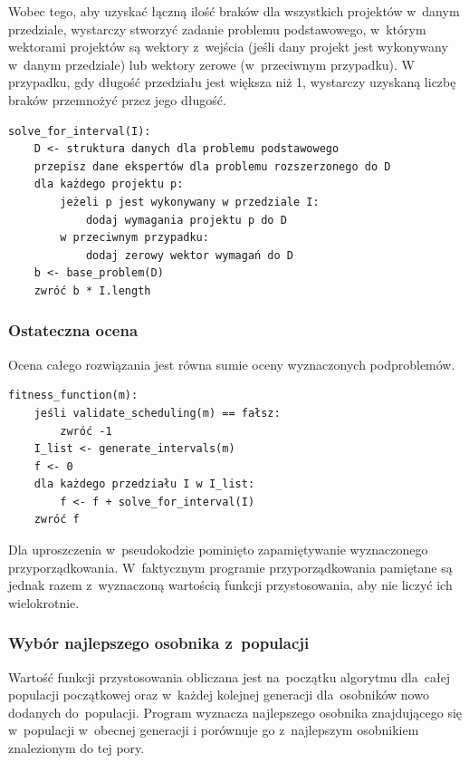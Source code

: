 \documentclass[12pt,a4paper]{article}
\theoremstyle{definition}
\begin{document}
\noindent
Wobec tego, aby uzyskać łączną ilość braków dla wszystkich projektów w~danym przedziale, wystarczy stworzyć zadanie problemu podstawowego, w~którym wektorami projektów są wektory z~wejścia (jeśli dany projekt jest wykonywany w~danym przedziale) lub wektory zerowe (w~przeciwnym przypadku).
W przypadku, gdy długość przedziału jest większa niż 1, wystarczy uzyskaną liczbę braków przemnożyć przez jego długość.\\

\begin{tcolorbox}[title=Ocena podproblemu]
\begin{verbatim}
solve_for_interval(I):
    D <- struktura danych dla problemu podstawowego
    przepisz dane ekspertów dla problemu rozszerzonego do D
    dla każdego projektu p:
        jeżeli p jest wykonywany w przedziale I:
            dodaj wymagania projektu p do D
        w przeciwnym przypadku:
            dodaj zerowy wektor wymagań do D
    b <- base_problem(D)
    zwróć b * I.length  
\end{verbatim}
\end{tcolorbox}

\subsubsection*{Ostateczna ocena}
Ocena całego rozwiązania jest równa sumie oceny wyznaczonych podproblemów.\\

\begin{tcolorbox}[title=Ocena pojedynczego rozwiązania]
\begin{verbatim}
fitness_function(m):
    jeśli validate_scheduling(m) == fałsz:
        zwróć -1
    I_list <- generate_intervals(m)
    f <- 0
    dla każdego przedziału I w I_list:
        f <- f + solve_for_interval(I)
    zwróć f
\end{verbatim}
\end{tcolorbox}
\vspace{0.5em}
\noindent
Dla uproszczenia w~pseudokodzie pominięto zapamiętywanie wyznaczonego przyporządkowania.
W~faktycznym programie przyporządkowania pamiętane są jednak razem z~wyznaczoną wartością funkcji przystosowania, aby nie liczyć ich wielokrotnie.

\subsubsection{Wybór najlepszego osobnika z~populacji}
Wartość funkcji przystosowania obliczana jest na~początku algorytmu dla~całej populacji początkowej oraz w~każdej kolejnej generacji dla~osobników nowo dodanych do~populacji.
Program wyznacza najlepszego osobnika znajdującego się w~populacji w~obecnej generacji i porównuje go z~najlepszym osobnikiem znalezionym do tej pory. \\
\end{document}
